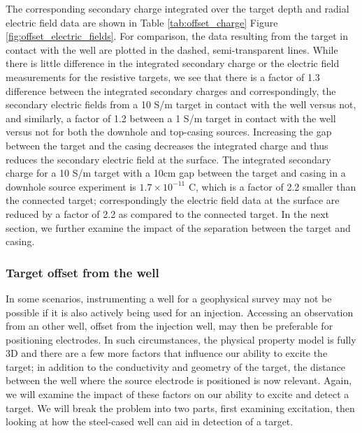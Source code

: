 

The corresponding secondary charge integrated over the target depth and radial electric field data are shown in Table \ref{tab:offset_charge} Figure \ref{fig:offset_electric_fields}. For comparison, the data resulting from the target in contact with the well are plotted in the dashed, semi-transparent lines. While there is little difference in the integrated secondary charge or the electric field measurements for the resistive targets, we see that there is a factor of 1.3 difference between the integrated secondary charges and correspondingly, the secondary electric fields from a 10 S/m target in contact with the well versus not, and similarly, a factor of 1.2 between a 1 S/m target in contact with the well versus not for both the downhole and top-casing sources. Increasing the gap between the target and the casing decreases the integrated charge and thus reduces the secondary electric field at the surface. The integrated secondary charge for a 10 S/m target with a 10cm gap between the target and casing in a downhole source experiment is $1.7 \times 10^{-11}$ C, which is a factor of 2.2 smaller than the connected target; correspondingly the electric field data at the surface are reduced by a factor of 2.2 as compared to the connected target. In the next section, we further examine the impact of the separation between the target and casing.









\subsubsection{Target offset from the well}
In some scenarios, instrumenting a well for a geophysical survey may not be possible if it is also actively being used for an injection. Accessing an observation from an other well, offset from the injection well, may then be preferable for positioning electrodes. In such circumstances, the physical property model is fully 3D and there are a few more factors that influence our ability to excite the target; in addition to the conductivity and geometry of the target, the distance between the well where the source electrode is positioned is now relevant. Again, we will examine the impact of these factors on our ability to excite and detect a target. We will break the problem into two parts, first examining excitation, then looking at how the steel-cased well can aid in detection of a target.

